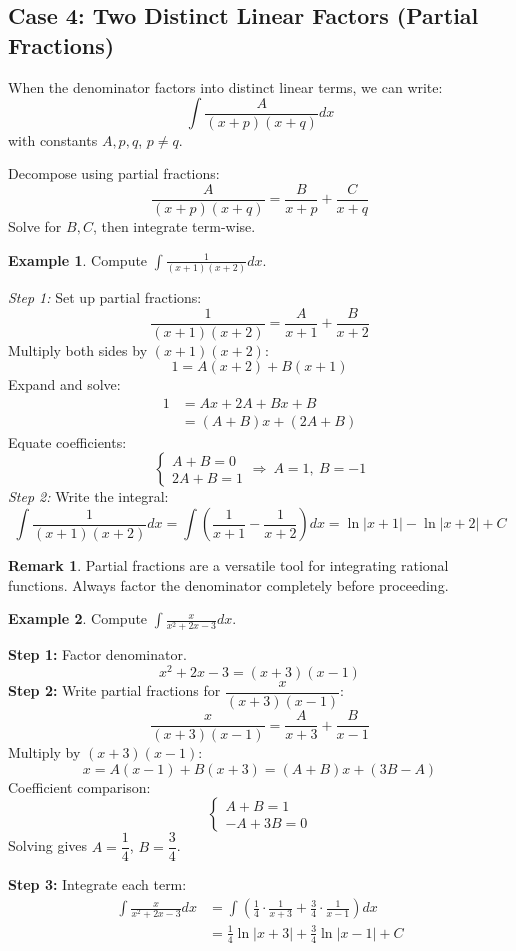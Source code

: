\documentclass[11pt]{article}
\theoremstyle{definition}
\newtheorem{examplex}{Example}[section]
\newtheorem*{remark}{Remark}
\theoremstyle{plain}
\begin{document}
\subsection{Case 4: Two Distinct Linear Factors (Partial Fractions)}

When the denominator factors into distinct linear terms, we can write:
\[
\int \frac{A}{(x + p)(x + q)} dx
\]
with constants $A, p, q$, $p \neq q$.

Decompose using partial fractions:
\[
\frac{A}{(x + p)(x + q)} = \frac{B}{x + p} + \frac{C}{x + q}
\]
Solve for $B,C$, then integrate term-wise.

\begin{examplex}
    Compute $\displaystyle \int \frac{1}{(x + 1)(x + 2)} dx$.
    
    \emph{Step 1:} Set up partial fractions:
    \[
    \frac{1}{(x + 1)(x + 2)} = \frac{A}{x + 1} + \frac{B}{x + 2}
    \]
    Multiply both sides by $(x + 1)(x + 2)$:
    \[
    1 = A(x + 2) + B(x + 1)
    \]
    Expand and solve:
    \begin{align*}
    1 &= A x + 2A + B x + B \\
      &= (A + B)x + (2A + B)
    \end{align*}
    Equate coefficients:
    \[
    \begin{cases}
    A + B = 0 \\
    2A + B = 1
    \end{cases}
    \Rightarrow ~ A = 1,~ B = -1
    \]
    \emph{Step 2:} Write the integral:
    \[
    \int \frac{1}{(x+1)(x+2)} dx = \int \left( \frac{1}{x+1} - \frac{1}{x+2} \right) dx = \ln|x+1| - \ln|x+2| + C
    \]
\end{examplex}

\begin{remark}
    Partial fractions are a versatile tool for integrating rational functions. Always factor the denominator completely before proceeding.
\end{remark}

\begin{examplex}
    Compute $\displaystyle \int \frac{x}{x^2 + 2x - 3} dx$.
    
    \textbf{Step 1:} Factor denominator.
    \[
    x^2 + 2x - 3 = (x + 3)(x - 1)
    \]
    \textbf{Step 2:} Write partial fractions for $\dfrac{x}{(x + 3)(x - 1)}$:
    \[
    \frac{x}{(x + 3)(x - 1)} = \frac{A}{x + 3} + \frac{B}{x - 1}
    \]
    Multiply by $(x+3)(x-1)$:
    \[
    x = A(x-1) + B(x+3) = (A+B)x + (3B - A)
    \]
    Coefficient comparison:
    \[
    \begin{cases}
        A + B = 1\\
        -A + 3B = 0
    \end{cases}
    \]
    Solving gives $A = \dfrac{1}{4}$, $B = \dfrac{3}{4}$.

    \textbf{Step 3:} Integrate each term:
    \begin{align*}
    \int \frac{x}{x^2 + 2x - 3} dx 
        &= \int \left( \frac{1}{4} \cdot \frac{1}{x+3} + \frac{3}{4} \cdot \frac{1}{x-1} \right) dx \\
        &= \frac{1}{4} \ln|x+3| + \frac{3}{4} \ln|x-1| + C
    \end{align*}
\end{examplex}
\end{document}
